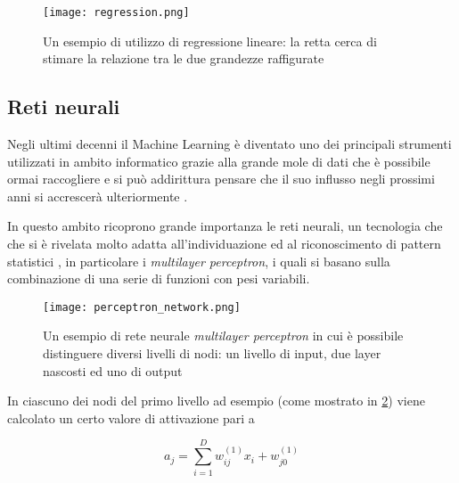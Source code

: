 \begin{figure}[bh]
    \begin{small}
        \begin{center}
            \texttt{[image: regression.png]}
        \end{center}
        \caption{Un esempio di utilizzo di regressione lineare: la retta cerca 
            di stimare la relazione tra le due grandezze raffigurate}
        \label{fig:}
    \end{small}
\end{figure}

\subsection{Reti neurali}
\label{section:neural_nets}

Negli ultimi decenni il Machine Learning è diventato uno dei principali strumenti utilizzati in 
ambito informatico grazie alla grande mole di dati che è possibile ormai raccogliere e si può 
addirittura pensare che il suo influsso negli prossimi anni si accrescerà ulteriormente \cite{Smola2008}.

In questo ambito ricoprono grande importanza le reti neurali, un tecnologia che che si è rivelata
molto adatta all'individuazione ed al riconoscimento di pattern statistici \cite{bishop2006pattern},
in particolare i \textit{multilayer perceptron}, i quali si basano sulla combinazione di una serie di funzioni con pesi variabili.

\begin{figure}
    \begin{small}
        \begin{center}
            \texttt{[image: perceptron\_network.png]}
        \end{center}
        \caption{Un esempio di rete neurale \textit{multilayer perceptron} in cui è 
            possibile distinguere diversi livelli di nodi: un livello di input, 
            due layer nascosti ed uno di output}
        \label{fig:nn}
    \end{small}
\end{figure}

In ciascuno dei nodi del primo livello ad esempio (come mostrato in \ref{fig:nn}) viene calcolato un certo valore 
di attivazione pari a 

\begin{equation}
    a_j = \sum_{i=1}^{D} w_{ij}^{(1)} x_i + w_{j0}^{(1)}
    \label{eq:node_nn}
\end{equation}

